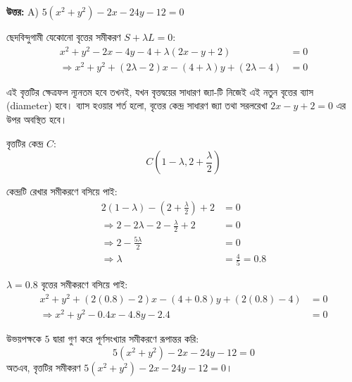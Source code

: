 \documentclass[12pt, a4paper]{article}
\begin{document}
\vspace{0.5em}
\begin{tcolorbox}[answerbox]
    \textbf{\color{success} উত্তর:} A) $5(x^2 + y^2) - 2x - 24y - 12 = 0$
\end{tcolorbox}
\vspace{1em}

\begin{tcolorbox}[solutionbox={সমাধান (Solution)}]
    \noindent
    ছেদবিন্দুগামী যেকোনো বৃত্তের সমীকরণ $S + \lambda L = 0$:
    \begin{align*}
        x^2 + y^2 - 2x - 4y - 4 + \lambda(2x - y + 2) &= 0 \\
        \Rightarrow x^2 + y^2 + (2\lambda - 2)x - (4 + \lambda)y + (2\lambda - 4) &= 0
    \end{align*}
    
    এই বৃত্তটির ক্ষেত্রফল ন্যূনতম হবে তখনই, যখন বৃত্তদ্বয়ের সাধারণ জ্যা-টি নিজেই এই নতুন বৃত্তের ব্যাস (diameter) হবে। ব্যাস হওয়ার শর্ত হলো, বৃত্তের কেন্দ্র সাধারণ জ্যা তথা সরলরেখা $2x - y + 2 = 0$ এর উপর অবস্থিত হবে। 
    
    বৃত্তটির কেন্দ্র $C$:
    \[ C\left(1 - \lambda, 2 + \frac{\lambda}{2}\right) \]
    
    কেন্দ্রটি রেখার সমীকরণে বসিয়ে পাই:
    \begin{align*}
        2(1 - \lambda) - \left(2 + \frac{\lambda}{2}\right) + 2 &= 0 \\
        \Rightarrow 2 - 2\lambda - 2 - \frac{\lambda}{2} + 2 &= 0 \\
        \Rightarrow 2 - \frac{5\lambda}{2} &= 0 \\
        \Rightarrow \lambda &= \frac{4}{5} = 0.8
    \end{align*}
    
    $\lambda = 0.8$ বৃত্তের সমীকরণে বসিয়ে পাই:
    \begin{align*}
        x^2 + y^2 + (2(0.8) - 2)x - (4 + 0.8)y + (2(0.8) - 4) &= 0 \\
        \Rightarrow x^2 + y^2 - 0.4x - 4.8y - 2.4 &= 0
    \end{align*}
    
    উভয়পক্ষকে $5$ দ্বারা গুণ করে পূর্ণসংখ্যার সমীকরণে রূপান্তর করি:
    \[ 5(x^2 + y^2) - 2x - 24y - 12 = 0 \]
    অতএব, বৃত্তটির সমীকরণ \textbf{$5(x^2 + y^2) - 2x - 24y - 12 = 0$}।
\end{tcolorbox}

\vspace{2em}
\end{document}

